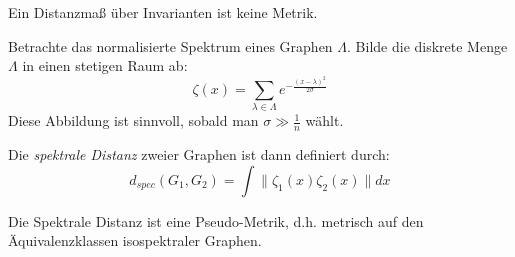 \begin{remark}
    Ein Distanzmaß über Invarianten ist keine Metrik.
\end{remark}

\begin{definition}
    Betrachte das normalisierte Spektrum eines Graphen $ \Lambda $.
    Bilde die diskrete Menge $ \Lambda $ in einen stetigen Raum ab:
    \begin{equation*}
        \zeta(x) = \sum_{\lambda \in \Lambda} e^{-\frac{(x - \lambda)^2}{2\sigma}}
    \end{equation*}
    Diese Abbildung ist sinnvoll, sobald man $ \sigma \gg \frac{1}{n} $ wählt.

    Die \textit{spektrale Distanz} zweier Graphen ist dann definiert durch:
    \begin{equation*}
        d_{spec}(G_1, G_2) = \int \| \zeta_1(x) \zeta_2(x) \| dx
    \end{equation*}
\end{definition}

\begin{remark}
    Die Spektrale Distanz ist eine Pseudo-Metrik, d.h. metrisch auf den Äquivalenzklassen isospektraler Graphen.
\end{remark}
